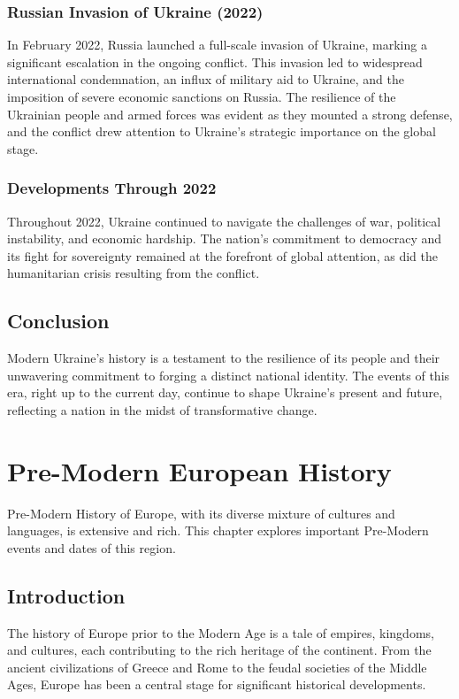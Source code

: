 \documentclass[a4paper,12pt]{book}
\begin{document}
\subsection{Russian Invasion of Ukraine (2022)}
In February 2022, Russia launched a full-scale invasion of Ukraine, marking a significant escalation in the ongoing conflict. This invasion led to widespread international condemnation, an influx of military aid to Ukraine, and the imposition of severe economic sanctions on Russia. The resilience of the Ukrainian people and armed forces was evident as they mounted a strong defense, and the conflict drew attention to Ukraine's strategic importance on the global stage.

\subsection{Developments Through 2022}
Throughout 2022, Ukraine continued to navigate the challenges of war, political instability, and economic hardship. The nation’s commitment to democracy and its fight for sovereignty remained at the forefront of global attention, as did the humanitarian crisis resulting from the conflict.

\section{Conclusion}
\label{sec:conclusion-modern-ukraine}
Modern Ukraine’s history is a testament to the resilience of its people and their unwavering commitment to forging a distinct national identity. The events of this era, right up to the current day, continue to shape Ukraine's present and future, reflecting a nation in the midst of transformative change.

\chapter{Pre-Modern European History}
\label{ch:pre-modern-european-history}

Pre-Modern History of Europe, with its diverse mixture of cultures and languages, is extensive and rich. This chapter explores important Pre-Modern events and dates of this region.

\section{Introduction}
\label{sec:introduction-pre-modern-europe}
The history of Europe prior to the Modern Age is a tale of empires, kingdoms, and cultures, each contributing to the rich heritage of the continent. From the ancient civilizations of Greece and Rome to the feudal societies of the Middle Ages, Europe has been a central stage for significant historical developments.
\end{document}
